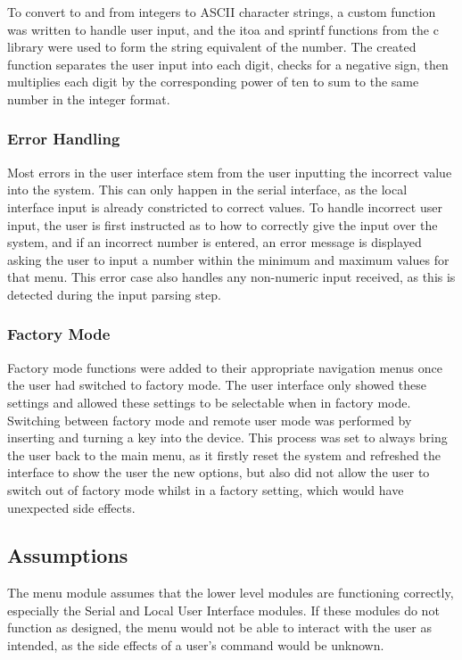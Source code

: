 \documentclass[]{report}
\begin{document}
To convert to and from integers to ASCII character strings, a custom function was written to handle user input, and the itoa and sprintf functions from the c library were used to form the string equivalent of the number. The created function separates the user input into each digit, checks for a negative sign, then multiplies each digit by the corresponding power of ten to sum to the same number in the integer format.

\subsubsection{Error Handling}
Most errors in the user interface stem from the user inputting the incorrect value into the system. This can only happen in the serial interface, as the local interface input is already constricted to correct values. To handle incorrect user input, the user is first instructed as to how to correctly give the input over the system, and if an incorrect number is entered, an error message is displayed asking the user to input a number within the minimum and maximum values for that menu. This error case also handles any non-numeric input received, as this is detected during the input parsing step. 

\subsubsection{Factory Mode}
Factory mode functions were added to their appropriate navigation menus once the user had switched to factory mode. The user interface only showed these settings and allowed these settings to be selectable when in factory mode. Switching between factory mode and remote user mode was performed by inserting and turning a key into the device. This process was set to always bring the user back to the main menu, as it firstly reset the system and refreshed the interface to show the user the new options, but also  did not allow the user to switch out of factory mode whilst in a factory setting, which would have unexpected side effects.

\subsection{Assumptions}
The menu module assumes that the lower level modules are functioning correctly, especially the Serial and Local User Interface modules. If these modules do not function as designed, the menu would not be able to interact with the user as intended, as the side effects of a user's command would be unknown. 
\end{document}
